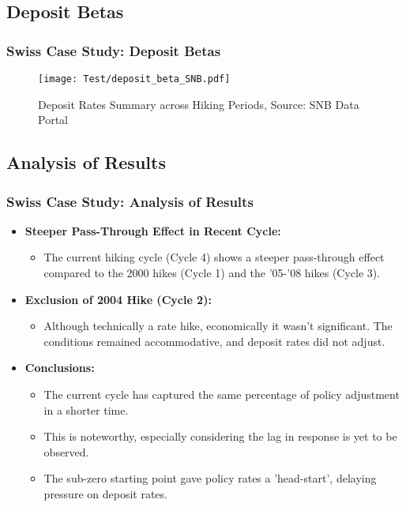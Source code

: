 \documentclass{beamer}
\begin{document}
\subsection{Deposit Betas}
\begin{frame}
\frametitle{Swiss Case Study: Deposit Betas}
\begin{center}
\begin{minipage}{1\textwidth}
\begin{figure}[H]
    \texttt{[image: Test/deposit\_beta\_SNB.pdf]}
    \caption{Deposit Rates Summary across Hiking Periods, Source: SNB Data Portal \cite{snb2023}}
    \label{fig:deposit_betas}
\end{figure}
\end{minipage}
\end{center}
\end{frame}

\subsection{Analysis of Results}
\begin{frame}
\frametitle{Swiss Case Study: Analysis of Results}
\begin{itemize}
    \item \textbf{Steeper Pass-Through Effect in Recent Cycle:}
    \begin{itemize}
        \item The current hiking cycle (Cycle 4) shows a steeper pass-through effect compared to the 2000 hikes (Cycle 1) and the '05-'08 hikes (Cycle 3).
    \end{itemize}
        \item \textbf{Exclusion of 2004 Hike (Cycle 2):}
    \begin{itemize}
        \item Although technically a rate hike, economically it wasn't significant. The conditions remained accommodative, and deposit rates did not adjust.
    \end{itemize}
        \item \textbf{Conclusions:}
    \begin{itemize}
        \item The current cycle has captured the same percentage of policy adjustment in a shorter time.
        \item This is noteworthy, especially considering the lag in response is yet to be observed.
        \item The sub-zero starting point gave policy rates a 'head-start', delaying pressure on deposit rates.
    \end{itemize}
\end{itemize}
\end{frame}
\end{document}
